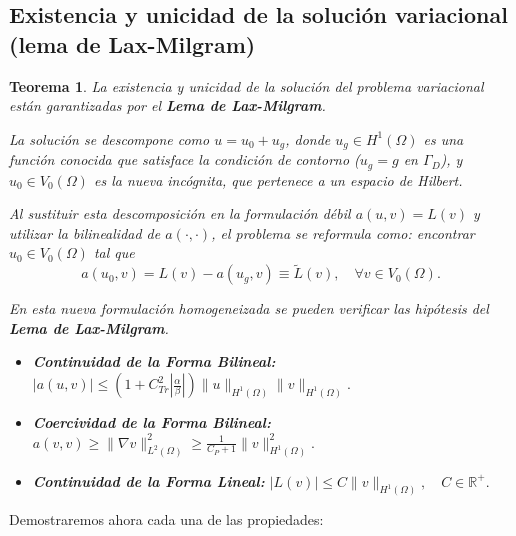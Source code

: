 \documentclass[11pt]{book}
\theoremstyle{plain} %
\newtheorem{teorema}{Teorema}[chapter]
\theoremstyle{definition} %
\theoremstyle{definition} %
\newcommand\R{\mathbb{R}}
\begin{document}
\subsection{Existencia y unicidad de la solución variacional (lema de Lax-Milgram)}
\label{sec:Lax}
\begin{teorema}
La existencia y unicidad de la solución del problema variacional están garantizadas por el \textbf{Lema de Lax-Milgram}. 

La solución se descompone como $u = u_0 + u_g$, donde $u_g \in H^1(\Omega)$ es una función conocida que satisface la condición de contorno ($u_g = g$ en $\Gamma_D$), y $u_0 \in V_0(\Omega)$ es la nueva incógnita, que pertenece a un espacio de Hilbert.

Al sustituir esta descomposición en la formulación débil $a(u, v) = L(v)$ y utilizar la bilinealidad de $a(\cdot, \cdot)$, el problema se reformula como: encontrar $u_0 \in V_0(\Omega)$ tal que
\begin{equation*}
    a(u_0, v) = L(v) - a(u_g, v) \equiv \widetilde{L}(v), \quad \forall v \in V_0(\Omega).
\end{equation*}

En esta nueva formulación homogeneizada se pueden verificar las hipótesis del \textbf{Lema de Lax-Milgram}.
\begin{itemize}
    \item \textbf{Continuidad de la Forma Bilineal: }$ | a(u,v) | \leq (1+C^2_{Tr}\left|\frac{\alpha}{\beta}\right|) \|u \|_{H^1(\Omega)}\|  v \|_{H^1(\Omega)}.$
    \item \textbf{Coercividad de la Forma Bilineal: }$ a(v,v) \geq  \| \nabla v \|^2_{L^2(\Omega)} \geq \frac{1}{C_P+1}\|v\|^2_{H^1(\Omega)}. $
    \item \textbf{Continuidad de la Forma Lineal: } $ |L(v) | \leq C\|v\|_{H^1(\Omega)}, \quad C\in \R^+. $
    
\end{itemize}
\end{teorema}

Demostraremos ahora cada una de las propiedades:
\end{document}
